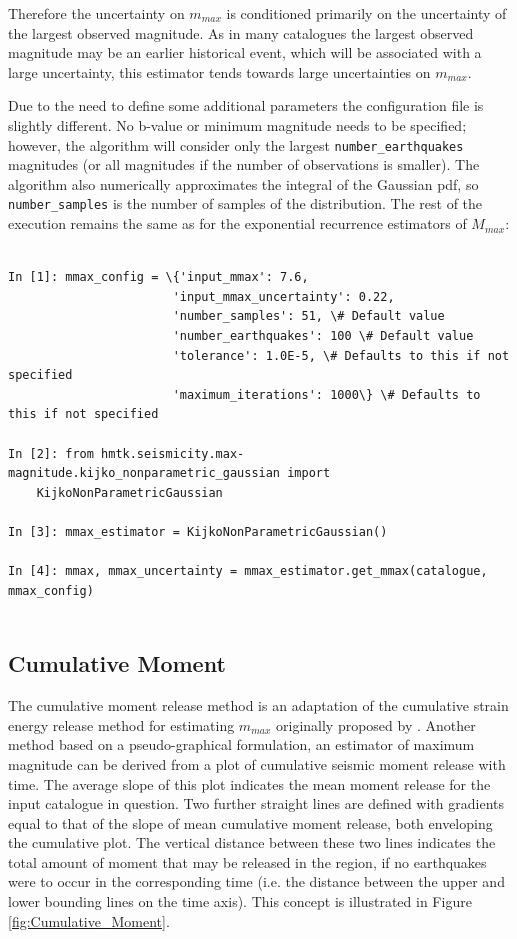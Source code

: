 Therefore the uncertainty on $m_{max}$ is conditioned primarily on the uncertainty of the largest observed magnitude. As in many catalogues the largest observed magnitude may be an earlier historical event, which will be associated with a large uncertainty, this estimator tends towards large uncertainties on $m_{max}$.

Due to the need to define some additional parameters the configuration file is slightly different. No b-value or minimum magnitude needs to be specified; however, the algorithm will consider only the largest \verb=number_earthquakes= magnitudes (or all magnitudes if the number of observations is smaller). The algorithm also numerically approximates the integral of the Gaussian pdf, so \verb=number_samples= is the number of samples of the distribution. The rest of the execution remains the same as for the exponential recurrence estimators of $M_{max}$:

\begin{Verbatim}[frame=single, commandchars=\\\{\}, fontsize=\scriptsize]

In [1]: mmax_config = \{'input_mmax': 7.6,
                       'input_mmax_uncertainty': 0.22,
                       'number_samples': 51, \# Default value
                       'number_earthquakes': 100 \# Default value
                       'tolerance': 1.0E-5, \# Defaults to this if not specified
                       'maximum_iterations': 1000\} \# Defaults to this if not specified
                       
In [2]: from hmtk.seismicity.max-magnitude.kijko_nonparametric_gaussian import
    KijkoNonParametricGaussian

In [3]: mmax_estimator = KijkoNonParametricGaussian()

In [4]: mmax, mmax_uncertainty = mmax_estimator.get_mmax(catalogue, mmax_config)
                
\end{Verbatim}


\subsection{Cumulative Moment \citep{MakropoulosBurton1983}}

The cumulative moment release method is an adaptation of the cumulative strain energy release method for estimating $m_{max}$ originally proposed by \cite{MakropoulosBurton1983}. Another method based on a pseudo-graphical formulation, an estimator of maximum magnitude can be derived from a plot of cumulative seismic moment release with time. The average slope of this plot indicates the mean moment release for the input catalogue in question. Two further straight lines are defined with gradients equal to that of the slope of mean cumulative moment release, both enveloping the cumulative plot. The vertical distance between these two lines indicates the total amount of moment that may be released in the region, if no earthquakes were to occur in the corresponding time (i.e. the distance between the upper and lower bounding lines on the time axis). This concept is illustrated in Figure \ref{fig:Cumulative_Moment}. 

